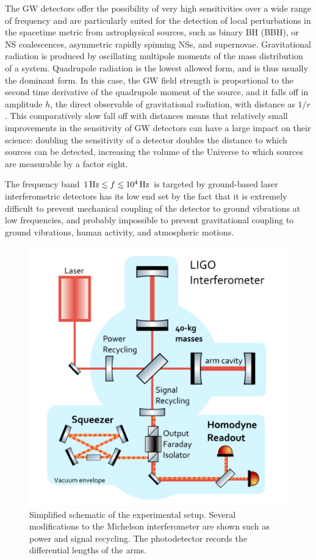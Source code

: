 \documentclass[binding=0.6cm, LaM]{sapthesis}
\begin{document}
	The GW detectors offer the possibility of very high sensitivities over a wide range of frequency and
        are particularly suited for the detection of local perturbations in the spacetime metric from astrophysical sources,
        such as binary BH (BBH), or NS coalescences, asymmetric rapidly spinning NSs,
        and supernovae.
 	Gravitational radiation is produced by oscillating multipole moments of the mass distribution of a system.
        Quadrupole radiation is the lowest allowed form, and is thus usually the dominant form.
        In this case, the GW field strength is proportional to the second time derivative of the quadrupole moment of the source,
        and it falls off in amplitude $h$, the direct observable of gravitational radiation, with distance as $1/r$.
        This comparatively slow fall off with distances means that relatively small improvements in the sensitivity
        of GW detectors can have a large impact on their science:
        doubling the sensitivity of a detector doubles the distance to which sources can be detected,
        increasing the volume of the Universe to which sources are measurable by a factor eight.

	The frequency band $1\,{\rm Hz} \apprle f \apprle 10^4\,{\rm Hz}$ is targeted by
        ground-based laser interferometric detectors has its low end set by the fact that it is extremely difficult
        to prevent mechanical coupling of the detector to ground vibrations at low frequencies,
        and probably impossible to prevent gravitational coupling to ground vibrations, human activity, and atmospheric motions.
        \begin{figure}[t]
          \includegraphics[scale=0.5]{interferometer}
          \centering
          \caption{Simplified schematic of the experimental setup. Several modifications to the Michelson interferometer are shown such as power and signal recycling. The photodetector records the differential lengths of the arms. \cite{9}}
          \label{fig:interferometer}
        \end{figure}
\end{document}
